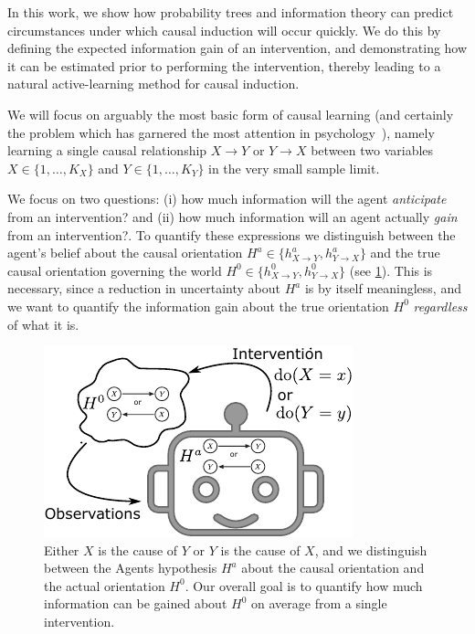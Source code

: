 \documentclass[letterpaper]{article} %
\begin{document}
In this work, we show how probability trees and information theory can predict circumstances under which causal induction will occur quickly. We do this by defining the expected information gain of an intervention, and demonstrating how it can be estimated prior to performing the intervention, thereby leading to a natural active-learning method for causal induction. 

We will focus on arguably the most basic form of causal learning (and certainly the problem which has garnered the most attention in psychology~\cite{gopnik2001causal}), namely learning a single causal relationship $X \rightarrow Y$ or $Y \rightarrow X$ between two variables $X \in \{1,\dots,K_X\}$ and $Y \in \{1,\dots,K_Y\}$ in the very small sample limit.

We focus on two questions: (i) how much information will the agent \emph{anticipate} from an intervention? and (ii) how much information will an agent actually \emph{gain} from an intervention?. To quantify these expressions we distinguish between the agent's belief about the causal orientation $H^a \in \{h^a_{X \rightarrow Y}, h^a_{Y \rightarrow X}\}$ and the true causal orientation governing the world $H^0 \in \{h^0_{X \rightarrow Y}, h^0_{Y \rightarrow X} \}$ (see \cref{fig1svg}). This is necessary, since a reduction in uncertainty about $H^a$ is by itself meaningless, and we want to quantify the information gain about the true orientation $H^0$ \emph{regardless} of what it is. 

\begin{figure}[t!]
	\centering
	\includegraphics[width=.75\linewidth]{fig1svg-crop}
	\caption{Either $X$ is the cause of $Y$ or $Y$ is the cause of $X$, and we distinguish between the Agents hypothesis $H^a$ about the causal orientation and the actual orientation $H^0$. Our overall goal is to quantify how much information can be gained about $H^0$ on average from a single intervention.}\label{fig1svg}
\end{figure}
\end{document}
